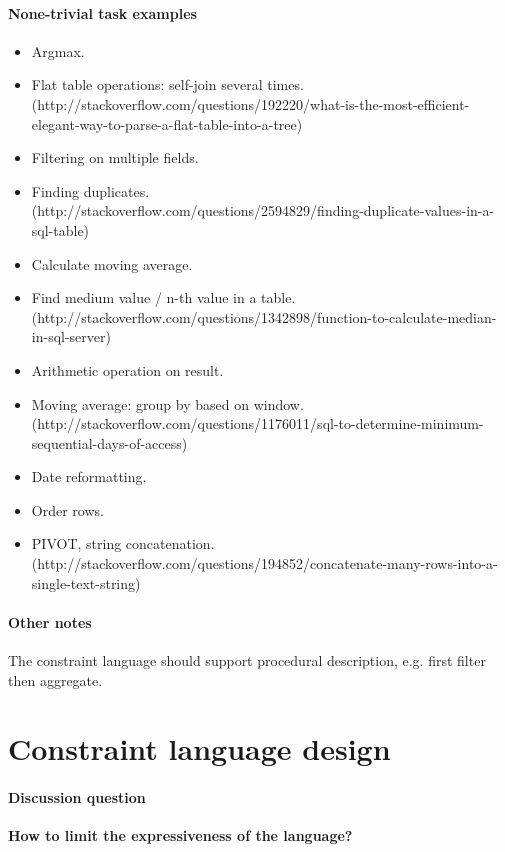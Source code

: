 \documentclass[letter, notitlepage]{article}
\begin{document}
\paragraph{None-trivial task examples}
\begin{itemize}
\item Argmax.
\item Flat table operations: self-join several times. \\
			(http://stackoverflow.com/questions/192220/what-is-the-most-efficient-elegant-way-to-parse-a-flat-table-into-a-tree)
\item Filtering on multiple fields.
\item Finding duplicates.\\
			(http://stackoverflow.com/questions/2594829/finding-duplicate-values-in-a-sql-table)
\item Calculate moving average.
\item Find medium value / n-th value in a table. \\
			(http://stackoverflow.com/questions/1342898/function-to-calculate-median-in-sql-server)
\item Arithmetic operation on result.
\item Moving average: group by based on window.\\
			(http://stackoverflow.com/questions/1176011/sql-to-determine-minimum-sequential-days-of-access)
\item Date reformatting.
\item Order rows.\\
\item PIVOT, string concatenation.\\
			(http://stackoverflow.com/questions/194852/concatenate-many-rows-into-a-single-text-string)
\end{itemize}

\paragraph{Other notes} The constraint language should support procedural description, e.g. first filter then aggregate.

\section{Constraint language design}

\paragraph{Discussion question} \textbf{How to limit the expressiveness of the language?}
\end{document}
